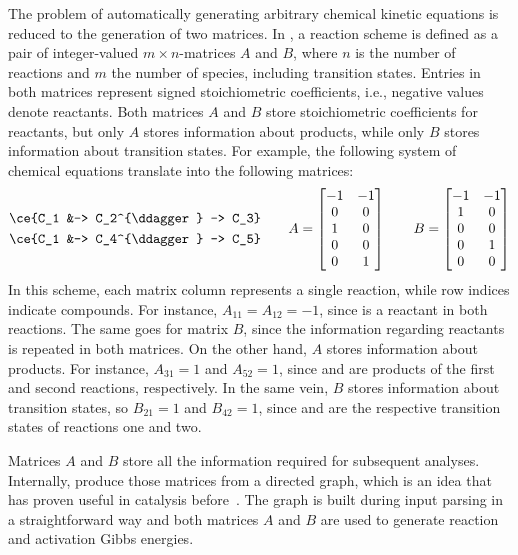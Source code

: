 The problem of automatically generating arbitrary chemical kinetic equations is reduced to the generation of two matrices.
In \overreact,
a reaction scheme is defined as a pair of integer-valued $m \times n$-matrices $A$ and $B$,
where $n$ is the number of reactions and $m$ the number of species,
including transition states.
Entries in both matrices represent signed stoichiometric coefficients,
i.e.,
negative values denote reactants.
Both matrices $A$ and $B$ store stoichiometric coefficients for reactants,
but only $A$ stores information about products,
while only $B$ stores information about transition states.
For example,
the following system of chemical equations translate into the following matrices:
% 
\begin{equation}
	\begin{split}
		\ce{C_1 &-> C_2^{\ddagger} -> C_3} \\
		\ce{C_1 &-> C_4^{\ddagger} -> C_5} \\
	\end{split}
	\qquad
	A = \begin{bmatrix}
		-1 & -1 \\
		0  & 0  \\
		1  & 0  \\
		0  & 0  \\
		0  & 1
	\end{bmatrix}
	\qquad
	B = \begin{bmatrix}
		-1 & -1 \\
		1  & 0  \\
		0  & 0  \\
		0  & 1  \\
		0  & 0
	\end{bmatrix}
\end{equation}
% 
In this scheme,
each matrix column represents a single reaction,
while row indices indicate compounds.
For instance,
$A_{11} = A_{12} = -1$,
since  is a reactant in both reactions.
The same goes for matrix $B$,
since the information regarding reactants is repeated in both matrices.
On the other hand,
$A$ stores information about products.
For instance,
$A_{31} = 1$ and $A_{52} = 1$,
since  and  are products of the first and second reactions,
respectively.
In the same vein,
$B$ stores information about transition states,
so $B_{21} = 1$ and $B_{42} = 1$,
since  and  are the respective transition states of reactions one and two.

Matrices $A$ and $B$ store all the information required for subsequent analyses.
Internally,
\overreact produce those matrices from a directed graph,
which is an idea that has proven useful in catalysis before~\cite{Kozuch_2006,Kozuch_2015,Solel_2019}.
The graph is built during input parsing in a straightforward way and both matrices $A$ and $B$ are used to generate reaction and activation Gibbs energies.


